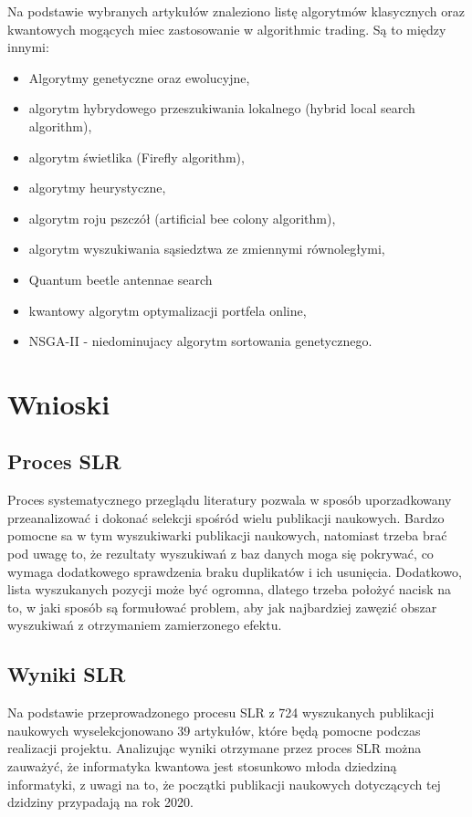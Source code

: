 \documentclass[polish,envcountsect,10pt]{article}
\begin{document}
Na podstawie wybranych artykułów znaleziono listę algorytmów klasycznych oraz kwantowych mogących miec zastosowanie w algorithmic trading. Są to między innymi:
\begin{itemize}
	\item Algorytmy genetyczne oraz ewolucyjne,
	\item algorytm hybrydowego przeszukiwania lokalnego (hybrid local search algorithm),
	\item algorytm świetlika (Firefly algorithm),
	\item algorytmy heurystyczne,
	\item algorytm roju pszczół (artificial bee colony algorithm),
	\item algorytm wyszukiwania sąsiedztwa ze zmiennymi równoległymi,
	\item Quantum beetle antennae search
	\item kwantowy algorytm optymalizacji portfela online,
	\item NSGA-II - niedominujacy algorytm sortowania genetycznego.
\end{itemize}


\section{Wnioski}

\subsection{Proces SLR}

Proces systematycznego przeglądu literatury pozwala w sposób uporzadkowany przeanalizować i dokonać selekcji spośród wielu publikacji naukowych. Bardzo pomocne sa w tym wyszukiwarki publikacji naukowych, natomiast trzeba brać pod uwagę to, że rezultaty wyszukiwań z baz danych moga się pokrywać, co wymaga dodatkowego sprawdzenia braku duplikatów i ich usunięcia. Dodatkowo, lista wyszukanych pozycji może być ogromna, dlatego trzeba położyć nacisk na to, w jaki sposób są formułować problem, aby jak najbardziej zawęzić obszar wyszukiwań z otrzymaniem zamierzonego efektu.

\subsection{Wyniki SLR}

Na podstawie przeprowadzonego procesu SLR z 724 wyszukanych publikacji naukowych wyselekcjonowano 39 artykułów, które będą pomocne podczas realizacji projektu. Analizując wyniki otrzymane przez proces SLR można zauważyć, że informatyka kwantowa jest stosunkowo młoda dziedziną informatyki, z uwagi na to, że początki publikacji naukowych dotyczących tej dzidziny przypadają na rok 2020.

\nocite{*}
\printbibliography
\end{document}
